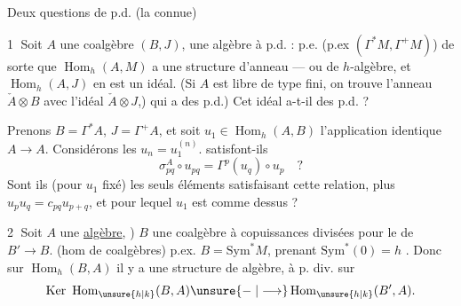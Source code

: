 Deux questions de p.d. (la  connue)

\textcircled{1} Soit $A$ une coalgèbre  $(B,J)$, une algèbre à p.d. : p.e. (p.ex $(\Gamma^*M,\Gamma^+M)$) de sorte que $\operatorname{Hom}_h(A,M)$ a une structure d’anneau --- ou de $h$-algèbre, et $\operatorname{Hom}_h(A,J)$ en est un idéal. (Si $A$ est libre de type fini, on trouve l’anneau $\check A\otimes B$ avec l’idéal $\check A\otimes J$,) qui a des p.d.) Cet idéal a-t-il des p.d. ?

 Prenons $B=\Gamma^*A$, $J=\Gamma^+A$, et soit $u_1\in\operatorname{Hom}_h(A,B)$ l’application identique $A\longrightarrow A$. Considérons les $u_n=u_1^{(n)}$. satisfont-ils
\[
\sigma_{pq}^A\circ u_{pq}=\Gamma^p(u_q)\circ u_p\quad ?
\]
Sont ils (pour $u_1$ fixé) les seuls éléments  satisfaisant cette relation, plus $u_pu_q=c_{pq}u_{p+q}$, et pour lequel $u_1$ est comme dessus ?

\textcircled{2} Soit $A$ une \uline{algèbre}, ) $B$ une coalgèbre à copuissances divisées pour le  de $B'\longrightarrow B$. (hom de coalgèbres) p.ex. $B=\mathrm{Sym}^*M$, prenant $\mathrm{Sym}^*(0)=h$ \unsure{---}. Donc sur $\operatorname{Hom}_h(B,A)$ il y a une structure de  algèbre, à p. div. sur
\[
\operatorname{Ker}\ \operatorname{Hom}_{\unsure{h|k}}(B,A)\unsure{\mathrel{-}|\longrightarrow}\operatorname{Hom}_{\unsure{h|k}}(B',A).
\]
